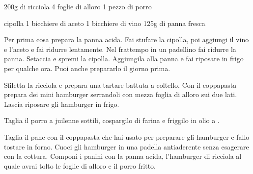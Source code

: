 \begin{ingreds}
	200g di ricciola
	4 foglie di alloro
	1 pezzo di porro
	
\columnbreak
{} cipolla
	1 bicchiere di aceto
	1 bicchiere di vino
	125g di panna fresca
\end{ingreds}

\begin{method}
	Per prima cosa prepara la panna acida. Fai stufare la cipolla, poi aggiungi il vino e l'aceto e fai ridurre lentamente. Nel frattempo in un padellino fai ridurre la panna. Setaccia e spremi la cipolla. Aggiungila alla panna e fai riposare in frigo per qualche ora. Puoi anche prepararlo il giorno prima.

	Sfiletta la ricciola e prepara una tartare battuta a coltello. Con il coppapasta prepara dei mini hamburger serrandoli con mezza foglia di alloro sui due lati. Lascia riposare gli hamburger in frigo.

	Taglia il porro a juilenne sottili, cospargilo di farina e friggilo in olio a .

	Taglia il pane con il coppapasta che hai usato per preparare gli hamburger e fallo tostare in forno.
	Cuoci gli hamburger in una padella antiaderente senza esagerare con la cottura. Componi i panini con la panna acida, l'hamburger di ricciola al quale avrai tolto le foglie di alloro e il porro fritto.
\end {method}

